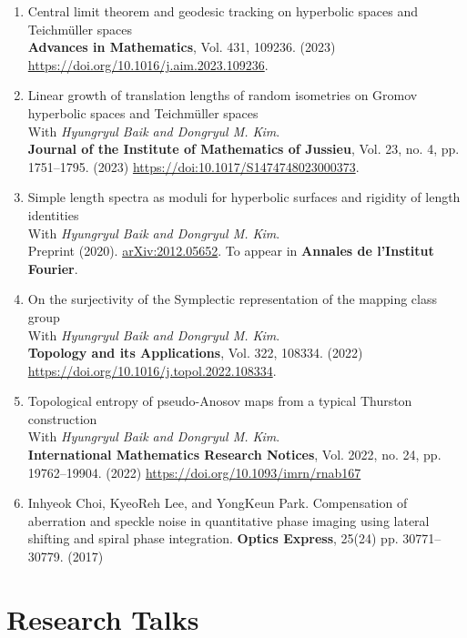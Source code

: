 \documentclass[a4paper, 10pt]{article}
\begin{document}
\begin{enumerate}
{\bf Geometry \& Topology}, Vol. 28, pp. 1923-1955. (2024) \url{https://doi.org/10.2140/gt.2024.28.1923}.
\item Central limit theorem and geodesic tracking on hyperbolic spaces and Teichmüller spaces \\
{\bf Advances in Mathematics}, Vol. 431, 109236. (2023) \url{https://doi.org/10.1016/j.aim.2023.109236}.
\item Linear growth of translation lengths of random isometries on Gromov hyperbolic spaces and Teichmüller spaces\\
With {\it Hyungryul Baik and Dongryul M. Kim}.\\
{\bf Journal of the Institute of Mathematics of Jussieu}, Vol. 23, no. 4, pp. 1751--1795. (2023) \url{https://doi:10.1017/S1474748023000373}.
\item Simple length spectra as moduli for hyperbolic surfaces and rigidity of length identities \\
With {\it Hyungryul Baik and Dongryul M. Kim}.\\
Preprint (2020). \href{https://arxiv.org/abs/2012.05652}{arXiv:2012.05652}. To appear in {\bf Annales de l'Institut Fourier}.
\item On the surjectivity of the Symplectic representation of the mapping class group \\
With {\it Hyungryul Baik and Dongryul M. Kim}.\\
{\bf Topology and its Applications}, Vol. 322, 108334. (2022) \url{https://doi.org/10.1016/j.topol.2022.108334}.
\item Topological entropy of pseudo-Anosov maps from a typical Thurston construction \\
With {\it Hyungryul Baik and Dongryul M. Kim}.\\
{\bf International Mathematics Research Notices}, Vol. 2022, no. 24, pp. 19762--19904. (2022) \url{https://doi.org/10.1093/imrn/rnab167}
\item Inhyeok Choi, KyeoReh Lee, and YongKeun Park. Compensation of aberration and speckle noise in quantitative phase imaging using lateral shifting and spiral phase integration. \textbf{Optics Express}, 25(24) pp. 30771--30779. (2017)
\end{enumerate}
\vspace{-0.3cm}


\section{Research Talks}
\end{document}
